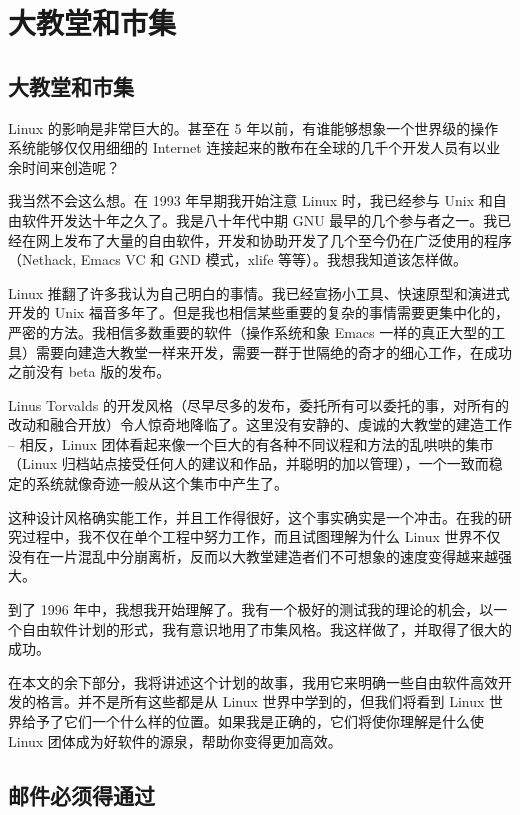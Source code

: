 \section{大教堂和市集}

\subsection{大教堂和市集}

Linux 的影响是非常巨大的。甚至在 5 年以前，有谁能够想象一个世界级的操作系统能够仅仅用细细的 Internet 连接起来的散布在全球的几千个开发人员有以业余时间来创造呢？


我当然不会这么想。在 1993 年早期我开始注意 Linux 时，我已经参与 Unix 和自由软件开发达十年之久了。我是八十年代中期 GNU 最早的几个参与者之一。我已经在网上发布了大量的自由软件，开发和协助开发了几个至今仍在广泛使用的程序（Nethack, Emacs VC 和 GND 模式，xlife 等等）。我想我知道该怎样做。

Linux 推翻了许多我认为自己明白的事情。我已经宣扬小工具、快速原型和演进式开发的 Unix 福音多年了。但是我也相信某些重要的复杂的事情需要更集中化的，严密的方法。我相信多数重要的软件（操作系统和象 Emacs 一样的真正大型的工具）需要向建造大教堂一样来开发，需要一群于世隔绝的奇才的细心工作，在成功之前没有 beta 版的发布。

Linus Torvalds 的开发风格（尽早尽多的发布，委托所有可以委托的事，对所有的改动和融合开放）令人惊奇地降临了。这里没有安静的、虔诚的大教堂的建造工作 -- 相反，Linux 团体看起来像一个巨大的有各种不同议程和方法的乱哄哄的集市（Linux 归档站点接受任何人的建议和作品，并聪明的加以管理），一个一致而稳定的系统就像奇迹一般从这个集市中产生了。

这种设计风格确实能工作，并且工作得很好，这个事实确实是一个冲击。在我的研究过程中，我不仅在单个工程中努力工作，而且试图理解为什么 Linux 世界不仅没有在一片混乱中分崩离析，反而以大教堂建造者们不可想象的速度变得越来越强大。

到了 1996 年中，我想我开始理解了。我有一个极好的测试我的理论的机会，以一个自由软件计划的形式，我有意识地用了市集风格。我这样做了，并取得了很大的成功。

在本文的余下部分，我将讲述这个计划的故事，我用它来明确一些自由软件高效开发的格言。并不是所有这些都是从 Linux 世界中学到的，但我们将看到 Linux 世界给予了它们一个什么样的位置。如果我是正确的，它们将使你理解是什么使 Linux 团体成为好软件的源泉，帮助你变得更加高效。


\subsection{邮件必须得通过}

